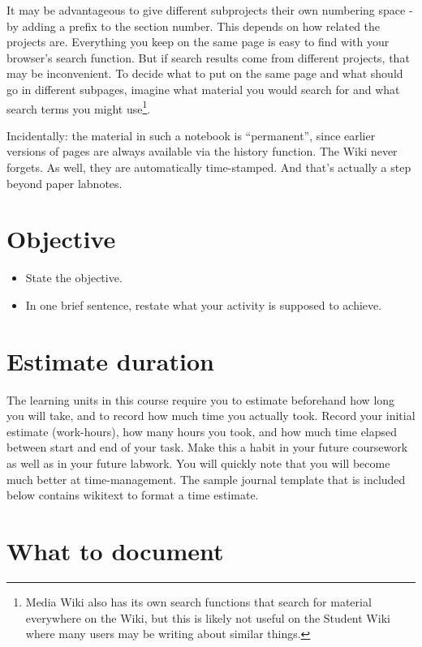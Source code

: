 \documentclass[]{book}
\providecommand{\tightlist}{%
  \setlength{\itemsep}{0pt}\setlength{\parskip}{0pt}}
\let\rmarkdownfootnote\footnote%
\def\footnote{\protect\rmarkdownfootnote}
\begin{document}
It may be advantageous to give different subprojects their own numbering
space - by adding a prefix to the section number. This depends on how
related the projects are. Everything you keep on the same page is easy
to find with your browser's search function. But if search results come
from different projects, that may be inconvenient. To decide what to put
on the same page and what should go in different subpages, imagine what
material you would search for and what search terms you might
use\footnote{Media Wiki also has its own search functions that search
  for material everywhere on the Wiki, but this is likely not useful on
  the Student Wiki where many users may be writing about similar things.}.

Incidentally: the material in such a notebook is ``permanent'', since
earlier versions of pages are always available via the history function.
The Wiki never forgets. As well, they are automatically time-stamped.
And that's actually a step beyond paper labnotes.

\section{Objective}\label{objective}

\begin{itemize}
\tightlist
\item
  State the objective.
\item
  In one brief sentence, restate what your activity is supposed to
  achieve.
\end{itemize}

\section{Estimate duration}\label{estimate-duration}

The learning units in this course require you to estimate beforehand how
long you will take, and to record how much time you actually took.
Record your initial estimate (work-hours), how many hours you took, and
how much time elapsed between start and end of your task. Make this a
habit in your future coursework as well as in your future labwork. You
will quickly note that you will become much better at time-management.
The sample journal template that is included below contains wikitext to
format a time estimate.

\section{What to document}\label{what-to-document}
\end{document}
